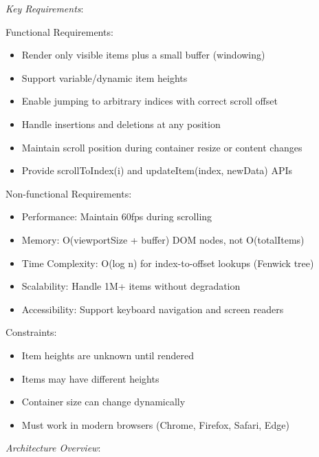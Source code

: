 \documentclass[11pt]{article}
\begin{document}
\emph{Key Requirements}:

Functional Requirements:

\begin{itemize}
\item Render only visible items plus a small buffer (windowing)
\item Support variable/dynamic item heights
\item Enable jumping to arbitrary indices with correct scroll offset
\item Handle insertions and deletions at any position
\item Maintain scroll position during container resize or content changes
\item Provide scrollToIndex(i) and updateItem(index, newData) APIs
\end{itemize}

Non-functional Requirements:

\begin{itemize}
\item Performance: Maintain 60fps during scrolling
\item Memory: O(viewportSize + buffer) DOM nodes, not O(totalItems)
\item Time Complexity: O(log n) for index-to-offset lookups (Fenwick tree)
\item Scalability: Handle 1M+ items without degradation
\item Accessibility: Support keyboard navigation and screen readers
\end{itemize}

Constraints:

\begin{itemize}
\item Item heights are unknown until rendered
\item Items may have different heights
\item Container size can change dynamically
\item Must work in modern browsers (Chrome, Firefox, Safari, Edge)
\end{itemize}

\emph{Architecture Overview}:
\end{document}
